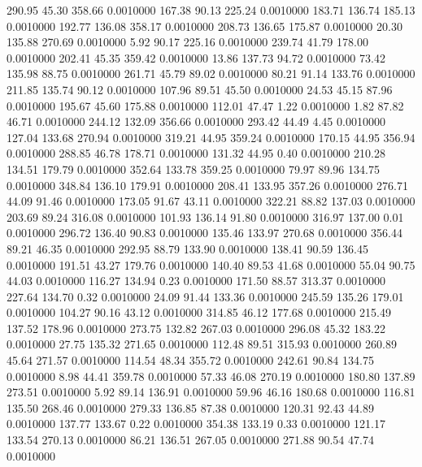  290.95   45.30  358.66   0.0010000
 167.38   90.13  225.24   0.0010000
 183.71  136.74  185.13   0.0010000
 192.77  136.08  358.17   0.0010000
 208.73  136.65  175.87   0.0010000
  20.30  135.88  270.69   0.0010000
   5.92   90.17  225.16   0.0010000
 239.74   41.79  178.00   0.0010000
 202.41   45.35  359.42   0.0010000
  13.86  137.73   94.72   0.0010000
  73.42  135.98   88.75   0.0010000
 261.71   45.79   89.02   0.0010000
  80.21   91.14  133.76   0.0010000
 211.85  135.74   90.12   0.0010000
 107.96   89.51   45.50   0.0010000
  24.53   45.15   87.96   0.0010000
 195.67   45.60  175.88   0.0010000
 112.01   47.47    1.22   0.0010000
   1.82   87.82   46.71   0.0010000
 244.12  132.09  356.66   0.0010000
 293.42   44.49    4.45   0.0010000
 127.04  133.68  270.94   0.0010000
 319.21   44.95  359.24   0.0010000
 170.15   44.95  356.94   0.0010000
 288.85   46.78  178.71   0.0010000
 131.32   44.95    0.40   0.0010000
 210.28  134.51  179.79   0.0010000
 352.64  133.78  359.25   0.0010000
  79.97   89.96  134.75   0.0010000
 348.84  136.10  179.91   0.0010000
 208.41  133.95  357.26   0.0010000
 276.71   44.09   91.46   0.0010000
 173.05   91.67   43.11   0.0010000
 322.21   88.82  137.03   0.0010000
 203.69   89.24  316.08   0.0010000
 101.93  136.14   91.80   0.0010000
 316.97  137.00    0.01   0.0010000
 296.72  136.40   90.83   0.0010000
 135.46  133.97  270.68   0.0010000
 356.44   89.21   46.35   0.0010000
 292.95   88.79  133.90   0.0010000
 138.41   90.59  136.45   0.0010000
 191.51   43.27  179.76   0.0010000
 140.40   89.53   41.68   0.0010000
  55.04   90.75   44.03   0.0010000
 116.27  134.94    0.23   0.0010000
 171.50   88.57  313.37   0.0010000
 227.64  134.70    0.32   0.0010000
  24.09   91.44  133.36   0.0010000
 245.59  135.26  179.01   0.0010000
 104.27   90.16   43.12   0.0010000
 314.85   46.12  177.68   0.0010000
 215.49  137.52  178.96   0.0010000
 273.75  132.82  267.03   0.0010000
 296.08   45.32  183.22   0.0010000
  27.75  135.32  271.65   0.0010000
 112.48   89.51  315.93   0.0010000
 260.89   45.64  271.57   0.0010000
 114.54   48.34  355.72   0.0010000
 242.61   90.84  134.75   0.0010000
   8.98   44.41  359.78   0.0010000
  57.33   46.08  270.19   0.0010000
 180.80  137.89  273.51   0.0010000
   5.92   89.14  136.91   0.0010000
  59.96   46.16  180.68   0.0010000
 116.81  135.50  268.46   0.0010000
 279.33  136.85   87.38   0.0010000
 120.31   92.43   44.89   0.0010000
 137.77  133.67    0.22   0.0010000
 354.38  133.19    0.33   0.0010000
 121.17  133.54  270.13   0.0010000
  86.21  136.51  267.05   0.0010000
 271.88   90.54   47.74   0.0010000
